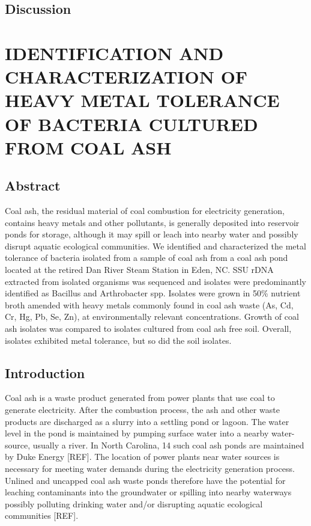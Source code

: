 \documentclass[ms]{uncgdissertationexp}
\theoremstyle{plain}
\theoremstyle{definition}
\theoremstyle{remark}
\begin{document}
  \section{Discussion}\label{discussion}
  
  \chapter{IDENTIFICATION AND CHARACTERIZATION OF HEAVY METAL TOLERANCE OF
  BACTERIA CULTURED FROM COAL ASH}\label{metal}
  
  \section{Abstract}\label{abstract-1}
  
  Coal ash, the residual material of coal combustion for electricity
  generation, contains heavy metals and other pollutants, is generally
  deposited into reservoir ponds for storage, although it may spill or
  leach into nearby water and possibly disrupt aquatic ecological
  communities. We identified and characterized the metal tolerance of
  bacteria isolated from a sample of coal ash from a coal ash pond located
  at the retired Dan River Steam Station in Eden, NC. SSU rDNA extracted
  from isolated organisms was sequenced and isolates were predominantly
  identified as Bacillus and Arthrobacter spp. Isolates were grown in 50\%
  nutrient broth amended with heavy metals commonly found in coal ash
  waste (As, Cd, Cr, Hg, Pb, Se, Zn), at environmentally relevant
  concentrations. Growth of coal ash isolates was compared to isolates
  cultured from coal ash free soil. Overall, isolates exhibited metal
  tolerance, but so did the soil isolates.
  
  \section{Introduction}\label{introduction-1}
  
  Coal ash is a waste product generated from power plants that use coal to
  generate electricity. After the combustion process, the ash and other
  waste products are discharged as a slurry into a settling pond or
  lagoon. The water level in the pond is maintained by pumping surface
  water into a nearby water-source, usually a river. In North Carolina, 14
  such coal ash ponds are maintained by Duke Energy {[}REF{]}. The
  location of power plants near water sources is necessary for meeting
  water demands during the electricity generation process. Unlined and
  uncapped coal ash waste ponds therefore have the potential for leaching
  contaminants into the groundwater or spilling into nearby waterways
  possibly polluting drinking water and/or disrupting aquatic ecological
  communities {[}REF{]}.
  
\end{document}
